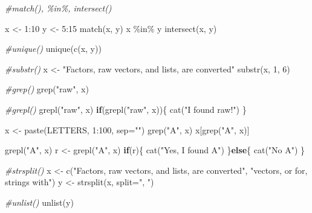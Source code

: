 \documentclass[
]{book}
\newenvironment{Shaded}{\begin{snugshade}}{\end{snugshade}}
\newcommand{\AttributeTok}[1]{\textcolor[rgb]{0.77,0.63,0.00}{#1}}
\newcommand{\CommentTok}[1]{\textcolor[rgb]{0.56,0.35,0.01}{\textit{#1}}}
\newcommand{\ControlFlowTok}[1]{\textcolor[rgb]{0.13,0.29,0.53}{\textbf{#1}}}
\newcommand{\DecValTok}[1]{\textcolor[rgb]{0.00,0.00,0.81}{#1}}
\newcommand{\FunctionTok}[1]{\textcolor[rgb]{0.00,0.00,0.00}{#1}}
\newcommand{\NormalTok}[1]{#1}
\newcommand{\OtherTok}[1]{\textcolor[rgb]{0.56,0.35,0.01}{#1}}
\newcommand{\SpecialCharTok}[1]{\textcolor[rgb]{0.00,0.00,0.00}{#1}}
\newcommand{\StringTok}[1]{\textcolor[rgb]{0.31,0.60,0.02}{#1}}
\begin{document}
\begin{Shaded}
\begin{Highlighting}[]
\CommentTok{\#match(), \%in\%, intersect()}

\NormalTok{x }\OtherTok{\textless{}{-}} \DecValTok{1}\SpecialCharTok{:}\DecValTok{10}
\NormalTok{y }\OtherTok{\textless{}{-}} \DecValTok{5}\SpecialCharTok{:}\DecValTok{15}
\FunctionTok{match}\NormalTok{(x, y)}
\NormalTok{x }\SpecialCharTok{\%in\%}\NormalTok{ y}
\FunctionTok{intersect}\NormalTok{(x, y)}

\CommentTok{\#unique()}
\FunctionTok{unique}\NormalTok{(}\FunctionTok{c}\NormalTok{(x, y))}

\CommentTok{\#substr()}
\NormalTok{x }\OtherTok{\textless{}{-}} \StringTok{"Factors, raw vectors, and lists, are converted"}
\FunctionTok{substr}\NormalTok{(x, }\DecValTok{1}\NormalTok{, }\DecValTok{6}\NormalTok{)}

\CommentTok{\#grep()}
\FunctionTok{grep}\NormalTok{(}\StringTok{"raw"}\NormalTok{, x)}

\CommentTok{\#grepl()}
\FunctionTok{grepl}\NormalTok{(}\StringTok{"raw"}\NormalTok{, x)}
\ControlFlowTok{if}\NormalTok{(}\FunctionTok{grepl}\NormalTok{(}\StringTok{"raw"}\NormalTok{, x))\{}
  \FunctionTok{cat}\NormalTok{(}\StringTok{"I found raw!"}\NormalTok{)}
\NormalTok{\}}

\NormalTok{x }\OtherTok{\textless{}{-}} \FunctionTok{paste}\NormalTok{(LETTERS, }\DecValTok{1}\SpecialCharTok{:}\DecValTok{100}\NormalTok{, }\AttributeTok{sep=}\StringTok{""}\NormalTok{)}
\FunctionTok{grep}\NormalTok{(}\StringTok{"A"}\NormalTok{, x)}
\NormalTok{x[}\FunctionTok{grep}\NormalTok{(}\StringTok{"A"}\NormalTok{, x)]}

\FunctionTok{grepl}\NormalTok{(}\StringTok{"A"}\NormalTok{, x)}
\NormalTok{r }\OtherTok{\textless{}{-}} \FunctionTok{grepl}\NormalTok{(}\StringTok{"A"}\NormalTok{, x)}
\ControlFlowTok{if}\NormalTok{(r)\{}
  \FunctionTok{cat}\NormalTok{(}\StringTok{"Yes, I found A"}\NormalTok{)}
\NormalTok{\}}\ControlFlowTok{else}\NormalTok{\{}
  \FunctionTok{cat}\NormalTok{(}\StringTok{"No A"}\NormalTok{)}
\NormalTok{\}}

\CommentTok{\#strsplit()}
\NormalTok{x }\OtherTok{\textless{}{-}} \FunctionTok{c}\NormalTok{(}\StringTok{"Factors, raw vectors, and lists, are converted"}\NormalTok{, }\StringTok{"vectors, or for, strings with"}\NormalTok{)}
\NormalTok{y }\OtherTok{\textless{}{-}} \FunctionTok{strsplit}\NormalTok{(x, }\AttributeTok{split=}\StringTok{", "}\NormalTok{)}

\CommentTok{\#unlist()}
\FunctionTok{unlist}\NormalTok{(y)}


\end{Highlighting}
\end{Shaded}
\end{document}
